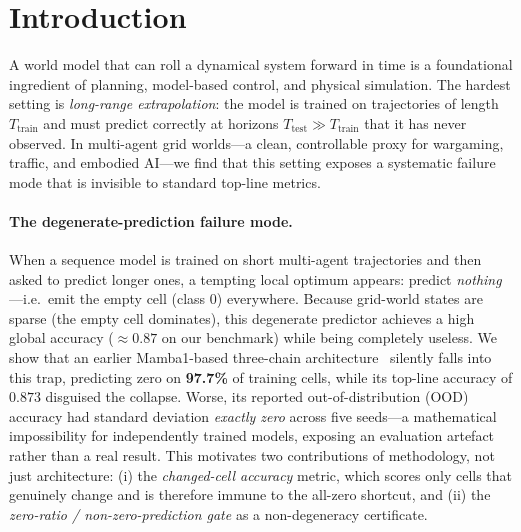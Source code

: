 \section{Introduction}
\label{sec:intro}

A world model that can roll a dynamical system forward in time is a
foundational ingredient of planning, model-based control, and physical
simulation. The hardest setting is \emph{long-range extrapolation}: the model
is trained on trajectories of length $T_{\text{train}}$ and must predict
correctly at horizons $T_{\text{test}} \gg T_{\text{train}}$ that it has never
observed. In multi-agent grid worlds---a clean, controllable proxy for
wargaming, traffic, and embodied AI---we find that this setting exposes a
systematic failure mode that is invisible to standard top-line metrics.

\paragraph{The degenerate-prediction failure mode.}
When a sequence model is trained on short multi-agent trajectories and then
asked to predict longer ones, a tempting local optimum appears: predict
\emph{nothing}---i.e.\ emit the empty cell (class 0) everywhere. Because
grid-world states are sparse (the empty cell dominates), this degenerate
predictor achieves a high global accuracy ($\approx 0.87$ on our benchmark)
while being completely useless. We show that an earlier Mamba1-based
three-chain architecture~\cite{mamba} silently falls into this trap, predicting
zero on \textbf{97.7\%} of training cells, while its top-line accuracy of
$0.873$ disguised the collapse. Worse, its reported out-of-distribution (OOD)
accuracy had standard deviation \emph{exactly zero} across five seeds---a
mathematical impossibility for independently trained models, exposing an
evaluation artefact rather than a real result. This motivates two contributions
of methodology, not just architecture: (i) the \emph{changed-cell accuracy}
metric, which scores only cells that genuinely change and is therefore immune
to the all-zero shortcut, and (ii) the \emph{zero-ratio / non-zero-prediction
gate} as a non-degeneracy certificate.

